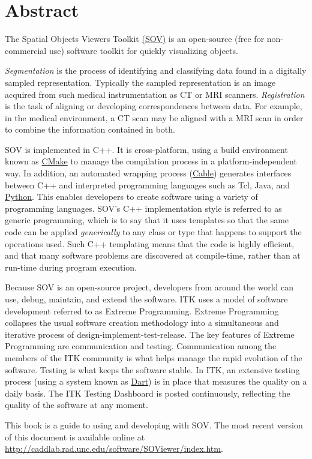 \chapter*{Abstract}
\noindent
The Spatial Objects Viewers Toolkit \href{http://caddlab.rad.unc.edu/software/SOViewer}{(SOV)} 
is an open-source (free for non-commercial use) software toolkit for 
quickly visualizing objects. 

\emph{Segmentation} is the process of identifying and
classifying data found in a digitally sampled
representation. Typically the sampled representation is an image
acquired from such medical instrumentation as CT or MRI
scanners. \emph{Registration} is the task of aligning or developing
correspondences between data. For example, in the medical environment,
a CT scan may be aligned with a MRI scan in order to combine the
information contained in both.

SOV is implemented in C++. It is cross-platform, using a build
environment known as \href{http://www.cmake.org}{CMake} to manage the
compilation process in a platform-independent way. In addition, an
automated wrapping process
(\href{http://public.kitware.com/Cable/HTML/Index.html}{Cable})
generates interfaces between C++ and interpreted programming languages
such as Tcl, Java, and \href{http://www.python.org}{Python}. This
enables developers to create software using a variety of programming
languages. SOV's C++ implementation style is referred to as generic
programming, which is to say that it uses templates so that the same
code can be applied \emph{generically} to any class or type that
happens to support the operations used. Such C++
templating means that the code is highly efficient, and that many
software problems are discovered at compile-time, rather than at
run-time during program execution.

Because SOV is an open-source project, developers from around the
world can use, debug, maintain, and extend the software. ITK uses a
model of software development referred to as Extreme
Programming. Extreme Programming collapses the usual software creation
methodology into a simultaneous and iterative process of
design-implement-test-release. The key features of Extreme Programming
are communication and testing. Communication among the members of the
ITK community is what helps manage the rapid evolution of the
software.  Testing is what keeps the software stable. In ITK, an
extensive testing process (using a system known as
\href{http://public.kitware.com/dashboard.php}{Dart}) is in place that
measures the quality on a daily basis. The ITK Testing Dashboard is
posted continuously, reflecting the quality of the software at any
moment.

This book is a guide to using and developing with SOV.
The most recent version of this document is available online at
\url{http://caddlab.rad.unc.edu/software/SOViewer/index.htm}.